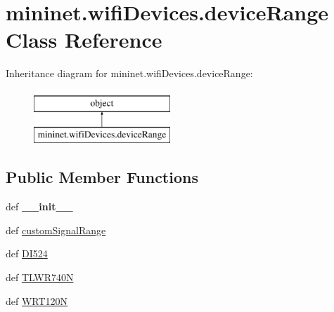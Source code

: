 \hypertarget{classmininet_1_1wifiDevices_1_1deviceRange}{\section{mininet.\-wifi\-Devices.\-device\-Range Class Reference}
\label{classmininet_1_1wifiDevices_1_1deviceRange}
}
Inheritance diagram for mininet.\-wifi\-Devices.\-device\-Range\-:\begin{figure}[H]
\begin{center}
\leavevmode
\includegraphics[height=2.000000cm]{classmininet_1_1wifiDevices_1_1deviceRange}
\end{center}
\end{figure}
\subsection*{Public Member Functions}
\begin{DoxyCompactItemize}
\item 
\hypertarget{classmininet_1_1wifiDevices_1_1deviceRange_ad7fe42f9f0a307c3444db23c944332f2}{def {\bfseries \-\_\-\-\_\-init\-\_\-\-\_\-}}\label{classmininet_1_1wifiDevices_1_1deviceRange_ad7fe42f9f0a307c3444db23c944332f2}

\item 
def \hyperlink{classmininet_1_1wifiDevices_1_1deviceRange_a388df9e7ba2079a449f3d9b2747849f2}{custom\-Signal\-Range}
\item 
def \hyperlink{classmininet_1_1wifiDevices_1_1deviceRange_a2919231acd6495a7614656ef3ef8a085}{D\-I524}
\item 
def \hyperlink{classmininet_1_1wifiDevices_1_1deviceRange_aa6d5de3aa8cd6a716e765055275d8825}{T\-L\-W\-R740\-N}
\item 
def \hyperlink{classmininet_1_1wifiDevices_1_1deviceRange_a883ce479154210f8857eb32592f2ad96}{W\-R\-T120\-N}
\end{DoxyCompactItemize}
